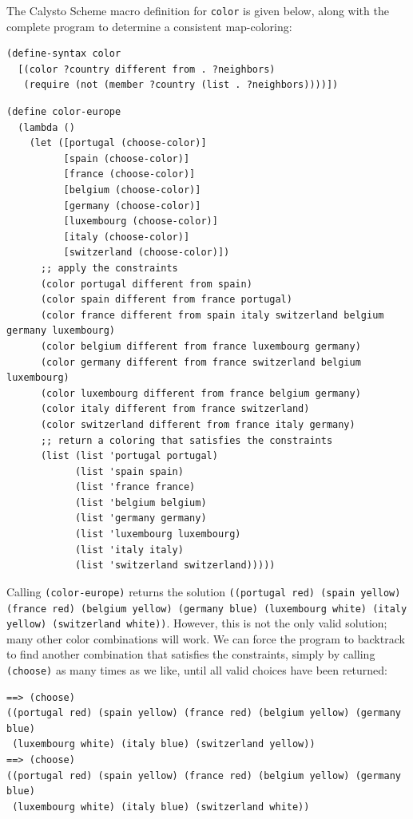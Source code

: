 \documentclass[acmsmall,screen,authorversion]{acmart}
\begin{document}
\noindent
The Calysto Scheme macro definition for \texttt{color} is given below, along
with the complete program to determine a consistent map-coloring:

{\small
\begin{verbatim}
(define-syntax color
  [(color ?country different from . ?neighbors)
   (require (not (member ?country (list . ?neighbors))))])
\end{verbatim}
}

\noindent
\begin{minipage}{\textwidth}
{\small
\begin{verbatim}
(define color-europe
  (lambda ()
    (let ([portugal (choose-color)]
          [spain (choose-color)]
          [france (choose-color)]
          [belgium (choose-color)]
          [germany (choose-color)]
          [luxembourg (choose-color)]
          [italy (choose-color)]
          [switzerland (choose-color)])
      ;; apply the constraints
      (color portugal different from spain)
      (color spain different from france portugal)
      (color france different from spain italy switzerland belgium germany luxembourg)
      (color belgium different from france luxembourg germany)
      (color germany different from france switzerland belgium luxembourg)
      (color luxembourg different from france belgium germany)
      (color italy different from france switzerland)
      (color switzerland different from france italy germany)
      ;; return a coloring that satisfies the constraints
      (list (list 'portugal portugal)
            (list 'spain spain)
            (list 'france france)
            (list 'belgium belgium)
            (list 'germany germany)
            (list 'luxembourg luxembourg)
            (list 'italy italy)
            (list 'switzerland switzerland)))))

\end{verbatim}
}
\end{minipage}

\noindent
Calling \texttt{(color-europe)} returns the solution \texttt{((portugal red)
(spain yellow) (france red) (belgium yellow) (germany blue) (luxembourg
white) (italy yellow) (switzerland white))}. However, this is not the only
valid solution; many other color combinations will work.  We can force the
program to backtrack to find another combination that satisfies the
constraints, simply by calling \texttt{(choose)} as many times as we like,
until all valid choices have been returned:

{\small
\begin{verbatim}
==> (choose)
((portugal red) (spain yellow) (france red) (belgium yellow) (germany blue)
 (luxembourg white) (italy blue) (switzerland yellow))
==> (choose)
((portugal red) (spain yellow) (france red) (belgium yellow) (germany blue)
 (luxembourg white) (italy blue) (switzerland white))
\end{verbatim}
}
\end{document}
